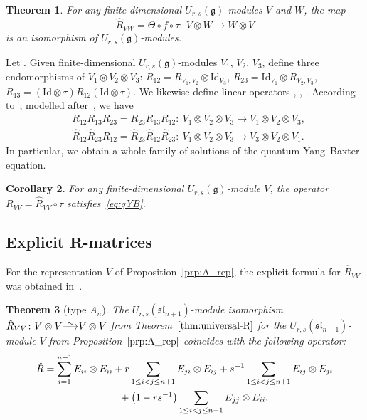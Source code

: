 \documentclass[10pt,a4paper]{amsart}
\numberwithin{equation}{section}
\newtheorem{Theorem}{Theorem}[section]
\newtheorem{Corollary}[Theorem]{Corollary}
\newcommand{\fg}{\mathfrak{g}}
\newcommand{\ssl}{\mathfrak{sl}}
\newcommand{\uu}{U_{r,s}(\fg)}
\newcommand\iso{ \vphantom{j^{X^2}}\smash{\overset{\sim}{\vphantom{\rule{0pt}{0.20em}}\smash{\longrightarrow}}} }
\begin{document}
\begin{Theorem}\label{thm:universal-R}
For any finite-dimensional $\uu$-modules $V$ and $W$, the map
\begin{equation}\label{eq:R-int}
 \hat{R}_{VW}=\Theta \circ \widetilde{f} \circ \tau\colon\ V \otimes W \to W \otimes V
\end{equation}
is an isomorphism of $\uu$-modules.
\end{Theorem}


Let . Given finite-dimensional $\uu$-modules $V_1$, $V_2$, $V_3$, define three endomorphisms of $V_1\otimes V_2\otimes V_3$: $R_{12}=R_{V_1,V_2}\otimes \mathrm{Id}_{V_3}$, $R_{23}=\mathrm{Id}_{V_1}\otimes R_{V_2,V_3}$, $R_{13}=(\mathrm{Id}\otimes \tau)R_{12}(\mathrm{Id}\otimes \tau)$. We likewise define linear operators , , . According to~\cite{BW1,BGH2}, modelled after~\cite{J}, we have
\begin{align}
 & R_{12} R_{13} R_{23} = R_{23} R_{13} R_{12}\colon\
 V_1\otimes V_2\otimes V_3 \to V_1\otimes V_2\otimes V_3,\nonumber \\
 & \hat{R}_{12} \hat{R}_{23} \hat{R}_{12} = \hat{R}_{23} \hat{R}_{12} \hat{R}_{23}\colon\
 V_1\otimes V_2\otimes V_3 \to V_3\otimes V_2\otimes V_1.\label{eq:qYB-two}
\end{align}
In particular, we obtain a whole family of solutions of the quantum Yang--Baxter equation.

\begin{Corollary}
For any finite-dimensional $\uu$-module $V$, the operator $R_{VV}=\hat{R}_{VV} \circ \tau$ satisfies~\eqref{eq:qYB}.
\end{Corollary}

\subsection[Explicit R-matrices]{Explicit $\boldsymbol{R}$-matrices}%

For the representation $V$ of Proposition~\ref{prp:A_rep}, the explicit formula for $\hat{R}_{VV}$ was obtained in~\cite[Sec\-tion~5]{BW2}.

\begin{Theorem}[type $A_{n}$]\label{thm:A_RMatrix}
The $U_{r,s}(\ssl_{n+1})$-module isomorphism $\hat{R}_{VV}\colon V \otimes V \iso V \otimes V$ from Theorem~$\ref{thm:universal-R}$ for the $U_{r,s}(\ssl_{n+1})$-module $V$ from Proposition~$\ref{prp:A_rep}$ coincides with the following operator:
\begin{gather}
 \hat{R} =
 \sum_{i=1}^{n+1} E_{ii} \otimes E_{ii}
 + r \sum_{1\leq i<j\leq n+1} E_{ji} \otimes E_{ij}+ s^{-1} \sum_{1\leq i<j\leq n+1} E_{ij} \otimes E_{ji}\nonumber\\
 \hphantom{\hat{R} =}{}
 + \bigl(1-rs^{-1}\bigr) \sum_{1\leq i<j\leq n+1} E_{jj} \otimes E_{ii} .\label{eq:A_RMatrix}
\end{gather}
\end{Theorem}
\end{document}
